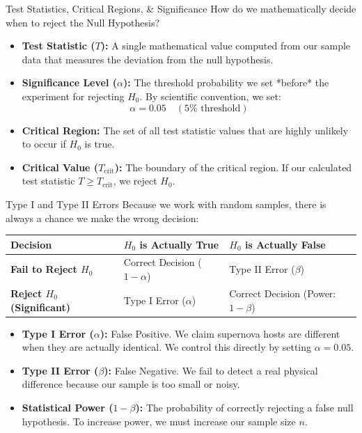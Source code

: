 \documentclass[9pt]{beamer}
\begin{document}
\begin{frame}{Test Statistics, Critical Regions, \& Significance}
  How do we mathematically decide when to reject the Null Hypothesis?
  \begin{itemize}
    \item \textbf{Test Statistic ($T$):} A single mathematical value computed from our sample data that measures the deviation from the null hypothesis.
    \item \textbf{Significance Level ($\alpha$):} The threshold probability we set *before* the experiment for rejecting $H_0$. By scientific convention, we set:
      $$\alpha = 0.05 \quad (5\% \text{ threshold})$$
    \item \textbf{Critical Region:} The set of all test statistic values that are highly unlikely to occur if $H_0$ is true.
    \item \textbf{Critical Value ($T_{\text{crit}}$):} The boundary of the critical region. If our calculated test statistic $T \ge T_{\text{crit}}$, we reject $H_0$.
  \end{itemize}
\end{frame}

\begin{frame}{Type I and Type II Errors}
  Because we work with random samples, there is always a chance we make the wrong decision:
  \begin{table}
    \centering
    \begin{tabular}{lll}
      \toprule
      Decision & $H_0$ is Actually True & $H_0$ is Actually False \\
      \midrule
      \textbf{Fail to Reject $H_0$} & Correct Decision ($1-\alpha$) & Type II Error ($\beta$) \\
      \textbf{Reject $H_0$ (Significant)} & \alert{Type I Error ($\alpha$)} & Correct Decision (Power: $1-\beta$) \\
      \bottomrule
    \end{tabular}
  \end{table}
  \begin{itemize}
    \item \textbf{Type I Error ($\alpha$):} False Positive. We claim supernova hosts are different when they are actually identical. We control this directly by setting $\alpha = 0.05$.
    \item \textbf{Type II Error ($\beta$):} False Negative. We fail to detect a real physical difference because our sample is too small or noisy.
    \item \textbf{Statistical Power ($1-\beta$):} The probability of correctly rejecting a false null hypothesis. To increase power, we must increase our sample size $n$.
  \end{itemize}
\end{frame}
\end{document}
